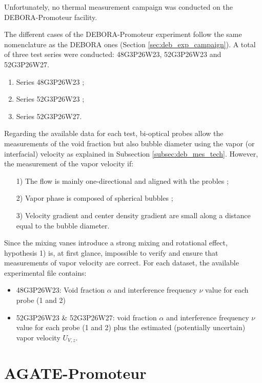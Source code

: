 \begin{note*}{}
Unfortunately, no thermal measurement campaign was conducted on the DEBORA-Promoteur facility.
\end{note*}

\npar


The different cases of the DEBORA-Promoteur experiment follow the same nomenclature as the DEBORA ones (Section \ref{sec:deb_exp_campaign}). A total of three test series were conducted: 48G3P26W23, 52G3P26W23 and 52G3P26W27.

\begin{enumerate}
\item Series 48G3P26W23 ;
\item Series 52G3P26W23 ; 
\item Series 52G3P26W27.
\end{enumerate}

Regarding the available data for each test, bi-optical probes allow the measurements of the void fraction but also bubble diameter using the vapor (or interfacial) velocity as explained in Subsection \ref{subsec:deb_mes_tech}. However, the measurement of the vapor velocity if:
\begin{enumerate}
\item[1)] The flow is mainly one-directional and aligned with the probles ;
\item[2)] Vapor phase is composed of spherical bubbles ;
\item[3)] Velocity gradient and center density gradient are small along a distance equal to the bubble diameter.
\end{enumerate}

Since the mixing vanes introduce a strong mixing and rotational effect, hypothesis 1) is, at first glance, impossible to verify and ensure that measurements of vapor velocity are correct. For each dataset, the available experimental file contains:

\begin{itemize}
\item 48G3P26W23: Void fraction $\alpha$ and interference frequency $\nu$ value for each probe (1 and 2)
\item 52G3P26W23 \& 52G3P26W27: void fraction $\alpha$ and interference frequency $\nu$ value for each probe (1 and 2) plus the estimated (potentially uncertain) vapor velocity $U_{V,z}$.
\end{itemize}


\section{AGATE-Promoteur}
\label{sec:agate_prom_desc}

